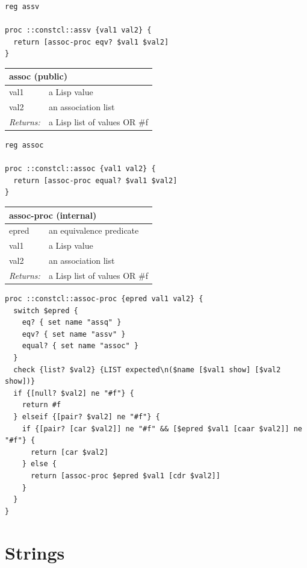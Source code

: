 \documentclass[twoside,9pt]{report}
\begin{document}
\noindent\makebox[\linewidth]{\rule{\linewidth}{0.4pt}}
\begin{lstlisting}
reg assv
 
proc ::constcl::assv {val1 val2} {
  return [assoc-proc eqv? $val1 $val2]
}
\end{lstlisting}
\noindent\makebox[\linewidth]{\rule{\linewidth}{0.4pt}}
\begin{tabular}{ |l l| }
\hline
\multicolumn{2}{|l|}{assoc (public)} \\
\hline
val1 & a Lisp value \\
val2 & an association list \\
\textit{Returns:} & a Lisp list of values OR \#f \\
\hline
\end{tabular}

\noindent\makebox[\linewidth]{\rule{\linewidth}{0.4pt}}
\begin{lstlisting}
reg assoc
 
proc ::constcl::assoc {val1 val2} {
  return [assoc-proc equal? $val1 $val2]
}
\end{lstlisting}
\noindent\makebox[\linewidth]{\rule{\linewidth}{0.4pt}}
\begin{tabular}{ |l l| }
\hline
\multicolumn{2}{|l|}{assoc-proc (internal)} \\
\hline
epred & an equivalence predicate \\
val1 & a Lisp value \\
val2 & an association list \\
\textit{Returns:} & a Lisp list of values OR \#f \\
\hline
\end{tabular}

\noindent\makebox[\linewidth]{\rule{\linewidth}{0.4pt}}
\begin{lstlisting}
proc ::constcl::assoc-proc {epred val1 val2} {
  switch $epred {
    eq? { set name "assq" }
    eqv? { set name "assv" }
    equal? { set name "assoc" }
  }
  check {list? $val2} {LIST expected\n($name [$val1 show] [$val2 show])}
  if {[null? $val2] ne "#f"} {
    return #f
  } elseif {[pair? $val2] ne "#f"} {
    if {[pair? [car $val2]] ne "#f" && [$epred $val1 [caar $val2]] ne "#f"} {
      return [car $val2]
    } else {
      return [assoc-proc $epred $val1 [cdr $val2]]
    }
  }
}
\end{lstlisting}
\noindent\makebox[\linewidth]{\rule{\linewidth}{0.4pt}}
\section{Strings}
\label{strings}
\end{document}
